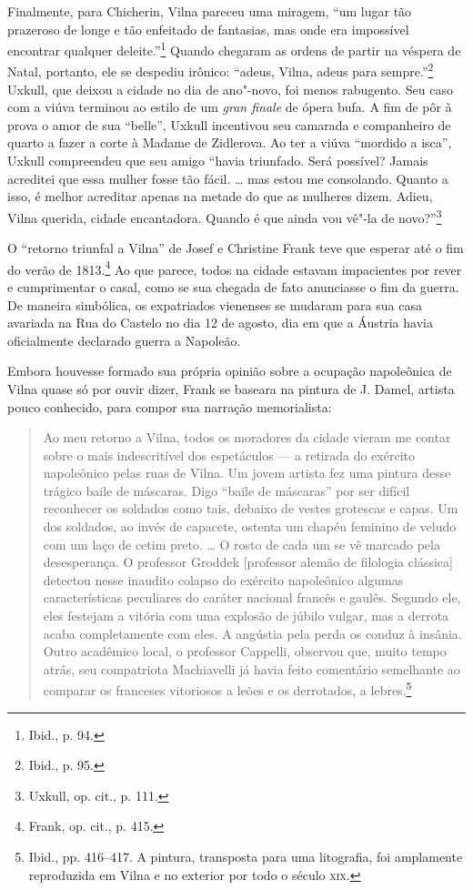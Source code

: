 Finalmente, para Chicherin, Vilna pareceu uma miragem, ``um lugar tão
prazeroso de longe e tão enfeitado de fantasias, mas onde era impossível
encontrar qualquer deleite.''\footnote{Ibid., p. 94.} Quando chegaram as
ordens de partir na véspera de Natal, portanto, ele se despediu irônico:
``adeus, Vilna, adeus para sempre.''\footnote{Ibid., p. 95.} Uxkull, que
deixou a cidade no dia de ano"-novo, foi menos rabugento. Seu caso com a
viúva terminou ao estilo de um \textit{gran finale} de ópera bufa. A fim
de pôr à prova o amor de sua ``belle'', Uxkull incentivou seu camarada e
companheiro de quarto a fazer a corte à Madame de Zidlerova. Ao ter a
viúva ``mordido a isca'', Uxkull compreendeu que seu amigo ``havia
triunfado. Será possível? Jamais acreditei que essa mulher fosse tão
fácil. \ldots{} mas estou me consolando. Quanto a isso, é melhor
acreditar apenas na metade do que as mulheres dizem. Adieu, Vilna
querida, cidade encantadora. Quando é que ainda vou vê"-la de
novo?''\footnote{Uxkull, op. cit., p. 111.}

\asterisc

O ``retorno triunfal a Vilna'' de Josef e Christine Frank teve que
esperar até o fim do verão de 1813.\footnote{Frank, op. cit., p. 415.}
Ao que parece, todos na cidade estavam impacientes por rever e
cumprimentar o casal, como se sua chegada de fato anunciasse o fim da
guerra. De maneira simbólica, os expatriados vienenses se mudaram para
sua casa avariada na Rua do Castelo no dia 12 de agosto, dia em que a
Áustria havia oficialmente declarado guerra a Napoleão.

Embora houvesse formado sua própria opinião sobre a ocupação napoleônica
de Vilna quase só por ouvir dizer, Frank se baseara na pintura de J.
Damel, artista pouco conhecido, para compor sua narração memorialista:

\begin{quote}
Ao meu retorno a Vilna, todos os moradores da cidade vieram me contar
sobre o mais indescritível dos espetáculos --- a retirada do exército
napoleônico pelas ruas de Vilna. Um jovem artista fez uma pintura desse
trágico baile de máscaras. Digo ``baile de máscaras'' por ser difícil
reconhecer os soldados como tais, debaixo de vestes grotescas e capas.
Um dos soldados, ao invés de capacete, ostenta um chapéu feminino de
veludo com um laço de cetim preto. \ldots{} O rosto de cada um se vê
marcado pela desesperança. O professor Groddek {[}professor alemão de
filologia clássica{]} detectou nesse inaudito colapso do exército
napoleônico algumas características peculiares do caráter nacional
francês e gaulês. Segundo ele, eles festejam a vitória com uma explosão
de júbilo vulgar, mas a derrota acaba completamente com eles. A angústia
pela perda os conduz à insânia. Outro acadêmico local, o professor
Cappelli, observou que, muito tempo atrás, seu compatriota Machiavelli
já havia feito comentário semelhante ao comparar os franceses vitoriosos
a leões e os derrotados, a lebres.\footnote{Ibid., pp. 416--417. A pintura, transposta para uma litografia, foi amplamente reproduzida em Vilna e no exterior por todo o século \textsc{xix}.} 
\end{quote}


